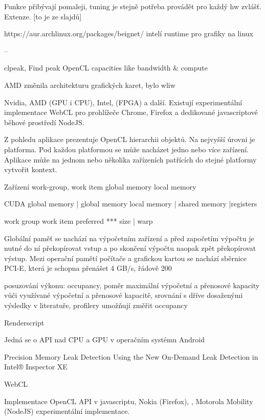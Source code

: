 Funkce přibývají pomaleji, tuning je stejně potřeba provádět pro každý hw zvlášť. Extenze. [to je ze slajdů]

https://aur.archlinux.org/packages/beignet/ intelí runtime pro grafiky na linux

--%



clpeak, Find peak OpenCL capacities like bandwidth \& compute 

AMD změnila architekturu grafických karet, bylo wliw

Nvidia, AMD (GPU i CPU), Intel, (FPGA) a další. Existují experimentální implementace WebCL pro prohlížeče Chrome, Firefox a dedikované javascriptové běhové prostředí NodeJS.

Z pohledu aplikace prezentuje OpenCL hierarchii objektů. Na nejvyšší úrovni je platforma. Pod každou platformou se může nacházet jedno nebo více zařízení. Aplikace může na jednom nebo několika zařízeních patřících do stejné platformy vytvořit kontext. 

Zařízení
work-group, work item
global memory
local memory

CUDA
global memory | global memory
local memory | shared memory
|registers

work group
work item
preferred *** size | warp

Globální paměť se nachází na výpočetním zařízení a před započetím výpočtu je nutné do ní překopírovat vstup a po skončení výpočtu naopak zpět překopírovat výstup. Mezi operační pamětí počítače a grafickou kartou se nachází sběrnice PCI-E, která je schopna přenášet 4 GB/s, řádově 200 

posuzování výkonu: occupancy, poměr maximální výpočetní a přenosové kapacity vůči využívané výpočetní a přenosové kapacitě, srovnání s dříve dosaženými výsledky v literatuře, profilery umožňují změřit occupancy

Renderscript

Jedná se o API nad CPU a GPU v operačním systému Android

Precision Memory Leak Detection Using the New On-Demand Leak Detection in Intel® Inspector XE

WebCL

Implementace OpenCL API v javascriptu, Nokia (Firefox), , Motorola Mobility (NodeJS) experimentální implementace.

